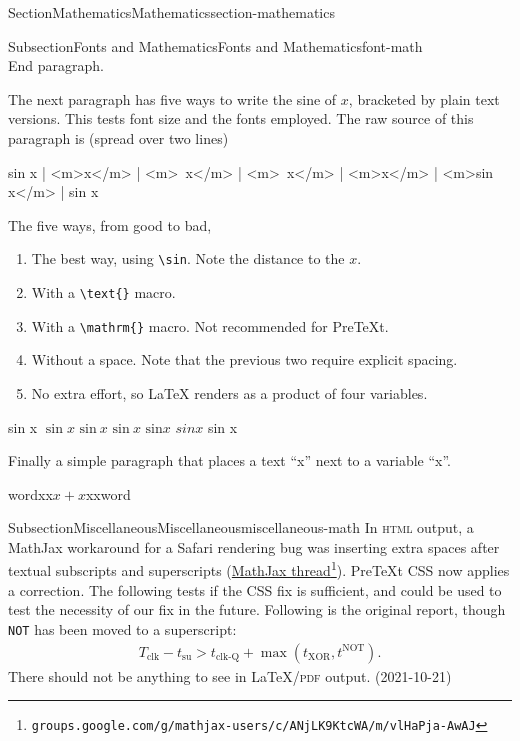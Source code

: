 \documentclass[twoside,10pt,]{article}
\newcommand{\mono}[1]{\texttt{#1}}
\newcommand{\initialism}[1]{\textsc{\MakeLowercase{#1}}}
\numberwithin{equation}{section}
\newcommand{\gt}{>}
\begin{document}
\begin{sectionptx}{Section}{Mathematics}{}{Mathematics}{}{}{section-mathematics}
\begin{subsectionptx}{Subsection}{Fonts and Mathematics}{}{Fonts and Mathematics}{}{}{font-math}
\begin{equation*}
\end{equation*}
End paragraph.%
\par
The next paragraph has five ways to write the sine of \(x\), bracketed by plain text versions.  This tests font size and the fonts employed.  The raw source of this paragraph is (spread over two lines)%
\begin{codedisplay}
sin x | <m>\sin x</m> | <m>\ x</m> | <m>\ x</m> |
<m>x</m> | <m>sin x</m> | sin x
\end{codedisplay}
The five ways, from good to bad,%
\begin{enumerate}
\item{}The best way, using  \mono{\textbackslash{}sin}.  Note the distance to the \(x\).%
\item{}With a \mono{\textbackslash{}text\{\}} macro.%
\item{}With a \mono{\textbackslash{}mathrm\{\}} macro.  Not recommended for PreTeXt.%
\item{}Without a space.  Note that the previous two require explicit spacing.%
\item{}No extra effort, so \LaTeX{} renders as a product of four variables.%
\end{enumerate}
%
\par
sin x \textbar{} \(\sin x\) \textbar{} \(\text{sin}\ x\) \textbar{} \(\mathrm{sin}\ x\)  \textbar{} \(\text{sin}x\) \textbar{} \(sin x\) \textbar{} sin x%
\par
Finally a simple paragraph that places a text ``x'' next to a variable ``x''.%
\par
wordxx\(x+x\)xxword%
\end{subsectionptx}
%
%
\typeout{************************************************}
\typeout{************************************************}
%
\begin{subsectionptx}{Subsection}{Miscellaneous}{}{Miscellaneous}{}{}{miscellaneous-math}
In \initialism{HTML} output, a MathJax workaround for a Safari rendering bug was inserting extra spaces after textual subscripts and superscripts (\href{https://groups.google.com/g/mathjax-users/c/ANjLK9KtcWA/m/vlHaPja-AwAJ}{MathJax thread}\footnote{\nolinkurl{groups.google.com/g/mathjax-users/c/ANjLK9KtcWA/m/vlHaPja-AwAJ}\label{miscellaneous-math-2-3}}).  PreTeXt CSS now applies a correction.  The following tests if the CSS fix is sufficient, and could be used to test the necessity of our fix in the future.  Following is the original report, though \mono{NOT} has been moved to a superscript:%
\begin{gather*}
T_\text{clk}-t_\text{su} \gt t_\text{clk-Q} + \max\left( t_\text{XOR}, t^\text{NOT} \right)\text{.}
\end{gather*}
There should not be anything to see in \LaTeX{}\slash{}\initialism{PDF} output. (2021-10-21)%
\end{subsectionptx}
\end{sectionptx}
\end{document}
